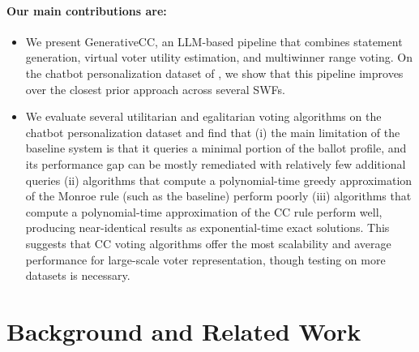 \documentclass[letterpaper]{article} %
\begin{document}
\paragraph{Our main contributions are:}
\begin{itemize}
    \item We present GenerativeCC, an LLM-based pipeline that combines statement generation, virtual voter utility estimation, and multiwinner range voting.
    On the chatbot personalization dataset of \citet{fish-v2}, we show that this pipeline improves over the closest prior approach across several SWFs.
    \item We evaluate several utilitarian and egalitarian voting algorithms on the chatbot personalization dataset and find that (i) the main limitation of the baseline system is that it queries a minimal portion of the ballot profile, and its performance gap can be mostly remediated with relatively few additional queries (ii) algorithms that compute a polynomial-time greedy approximation of the Monroe rule (such as the baseline) perform poorly (iii) algorithms that compute a polynomial-time approximation of the CC rule perform well, producing near-identical results as exponential-time exact solutions.
    This suggests that CC voting algorithms offer the most scalability and average performance for large-scale voter representation, though testing on more datasets is necessary.
\end{itemize}

\section{Background and Related Work}
\end{document}
